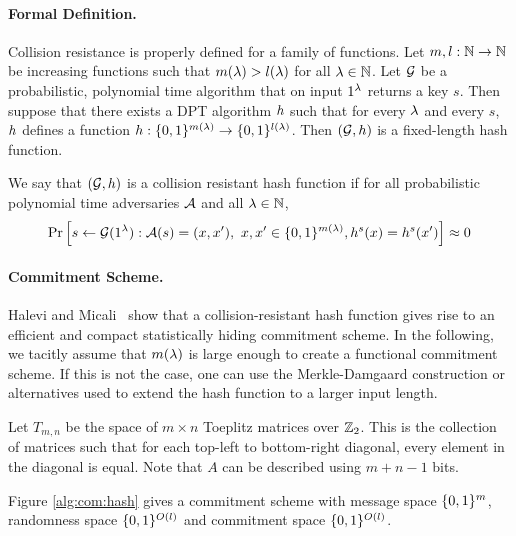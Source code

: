 \paragraph{Formal Definition.} Collision resistance is properly defined for a family of functions. Let $m, l : \mathbb{N} \to \mathbb{N}$ be increasing functions such that $m (\lambda) > l(\lambda)$ for all $\lambda \in \mathbb{N}$. Let $\mathcal{G}$ be a probabilistic, polynomial time algorithm that on input $1^{\lambda}$ returns a key $s$. Then suppose that there exists a DPT algorithm $h$ such that for every $\lambda$ and every $s$, $h$ defines a function $h : \{0,1\}^{m(\lambda)} \to \{0,1\}^{l(\lambda)}$. Then $(\mathcal{G},h)$ is a fixed-length hash function.

We say that $(\mathcal{G},h)$ is a collision resistant hash function if for all probabilistic polynomial time adversaries $\mathcal{A}$ and all $\lambda \in \mathbb{N}$,
$$ \Pr \left[ s \gets \mathcal{G}(1^{\lambda}) : \mathcal{A}(s) = (x,x'), \ x,x'\in \{0,1\}^{m(\lambda)}, h^s(x) = h^s(x') \right] \approx 0 $$

\paragraph{Commitment Scheme.} Halevi and Micali~\cite{HalMic96} show that a collision-resistant hash function gives rise to an efficient and compact statistically hiding commitment scheme. In the following, we tacitly assume that $m(\lambda)$ is large enough to create a functional commitment scheme. If this is not the case, one can use the Merkle-Damgaard construction or alternatives \cite{Lucks04,NandiP10} used to extend the hash function to a larger input length.

Let $T_{m,n}$ be the space of $m \times n$ Toeplitz matrices over $\mathbb{Z}_2$. This is the collection of matrices such that for each top-left to bottom-right diagonal, every element in the diagonal is equal. Note that $A$ can be described using $m+n-1$ bits.

Figure \ref{alg:com:hash} gives a commitment scheme with message space $\{0,1\}^{m}$, randomness space $\{0,1\}^{O(l)}$ and commitment space $\{0,1\}^{O(l)}$.

